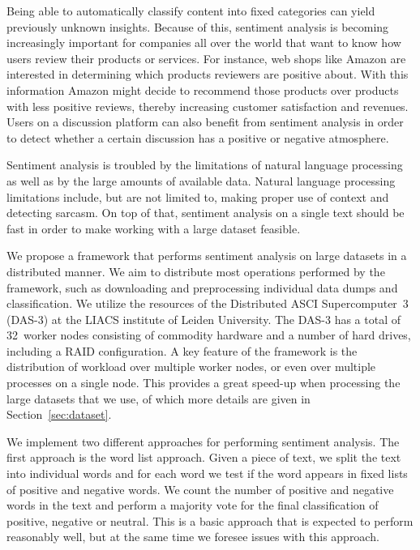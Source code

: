\documentclass{article}
\begin{document}
Being able to automatically classify content into fixed categories can yield
previously unknown insights. Because of this, sentiment analysis is becoming
increasingly important for companies all over the world that want to know how
users review their products or services. For instance, web shops like Amazon
are interested in determining which products reviewers are positive about.
With this information Amazon might decide to recommend those products over
products with less positive reviews, thereby increasing customer satisfaction
and revenues. Users on a discussion platform can also benefit from sentiment 
analysis in order to detect whether a certain discussion has a positive or 
negative atmosphere.

Sentiment analysis is troubled by the limitations of natural language processing
as well as by the large amounts of available data. Natural language processing
limitations include, but are not limited to, making proper use of context and
detecting sarcasm. On top of that, sentiment analysis on a single text should be
fast in order to make working with a large dataset feasible.

We propose a framework that performs sentiment analysis on large datasets in a
distributed manner. We aim to distribute most operations performed by the 
framework, such as downloading and preprocessing individual data dumps and
classification. We utilize the resources of the Distributed ASCI 
Supercomputer~3 (DAS-3) at the LIACS institute of Leiden University. The DAS-3 
has a total of 32~worker nodes consisting of commodity hardware and a number of 
hard drives, including a RAID configuration. A key feature of the framework is 
the distribution of workload over multiple worker nodes, or even over multiple 
processes on a single node. This provides a great speed-up when processing the 
large datasets that we use, of which more details are given in 
Section~\ref{sec:dataset}.

We implement two different approaches for performing sentiment analysis. The
first approach is the word list approach. Given a piece of text, we split the 
text into individual words and for each word we test if the word appears in 
fixed lists of positive and negative words. We count the number of positive and 
negative words in the text and perform a majority vote for the final 
classification of positive, negative or neutral. This is a basic approach that 
is expected to perform reasonably well, but at the same time we foresee issues 
with this approach.
\end{document}
